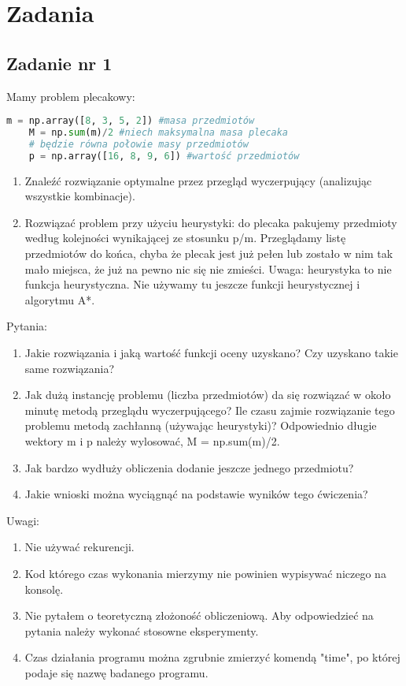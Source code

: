     
    \section{Zadania}

    \subsection{Zadanie nr 1}
    Mamy problem plecakowy:
    \begin{lstlisting}[language=Python]
    m = np.array([8, 3, 5, 2]) #masa przedmiotów
    M = np.sum(m)/2 #niech maksymalna masa plecaka 
    # będzie równa połowie masy przedmiotów
    p = np.array([16, 8, 9, 6]) #wartość przedmiotów
    \end{lstlisting}

    \begin{enumerate}
      \item Znaleźć rozwiązanie optymalne przez przegląd wyczerpujący (analizując 
        wszystkie kombinacje). 
      \item Rozwiązać problem przy użyciu heurystyki: do plecaka pakujemy 
        przedmioty według kolejności wynikającej ze stosunku p/m. Przeglądamy listę
        przedmiotów do końca, chyba że plecak jest już pełen lub zostało w nim tak
        mało miejsca, że już na pewno nic się nie zmieści. Uwaga: heurystyka to nie
        funkcja heurystyczna. Nie używamy tu jeszcze funkcji heurystycznej i
        algorytmu A*.
    \end{enumerate}


    Pytania:
    \begin{enumerate}
      \item Jakie rozwiązania i jaką wartość funkcji oceny uzyskano? Czy uzyskano
        takie same rozwiązania?
      \item Jak dużą instancję problemu (liczba przedmiotów) da się rozwiązać w 
        około minutę metodą przeglądu wyczerpującego? Ile czasu zajmie 
        rozwiązanie tego problemu metodą zachłanną (używając heurystyki)?
        Odpowiednio długie wektory m i p należy wylosować, M = np.sum(m)/2.
      \item Jak bardzo wydłuży obliczenia dodanie jeszcze jednego przedmiotu?
      \item Jakie wnioski można wyciągnąć na podstawie wyników tego ćwiczenia?
    \end{enumerate}

    Uwagi:
    \begin{enumerate}
      \item Nie używać rekurencji.
      \item Kod którego czas wykonania mierzymy nie powinien wypisywać niczego na
        konsolę.
      \item Nie pytałem o teoretyczną złożoność obliczeniową. Aby odpowiedzieć na
        pytania należy wykonać stosowne eksperymenty.
      \item Czas działania programu można zgrubnie zmierzyć komendą "time", po
        której podaje się nazwę badanego programu. 
    \end{enumerate}
